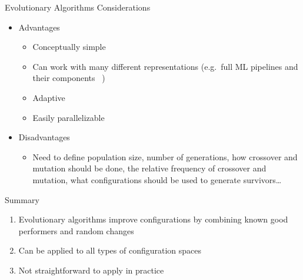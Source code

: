 \documentclass[main]{subfiles}
\begin{document}
\begin{frame}{Evolutionary Algorithms Considerations}
    \begin{itemize}
        \item Advantages
            \begin{itemize}
                \item Conceptually simple
                \item Can work with many different representations (e.g.\ full
                    ML pipelines and their components ~)
                \item Adaptive
                \item Easily parallelizable
            \end{itemize}
        \item Disadvantages
            \begin{itemize}
                \item Need to define population size, number of generations, how
                    crossover and mutation should be done, the relative
                    frequency of crossover and mutation, what configurations
                    should be used to generate survivors\ldots
            \end{itemize}
    \end{itemize}
\end{frame}


\begin{frame}{Summary} 
\begin{enumerate}
    \item Evolutionary algorithms improve configurations by combining known good
        performers and random changes
    \item Can be applied to all types of configuration spaces
    \item Not straightforward to apply in practice
\end{enumerate}
\end{frame}
\end{document}
